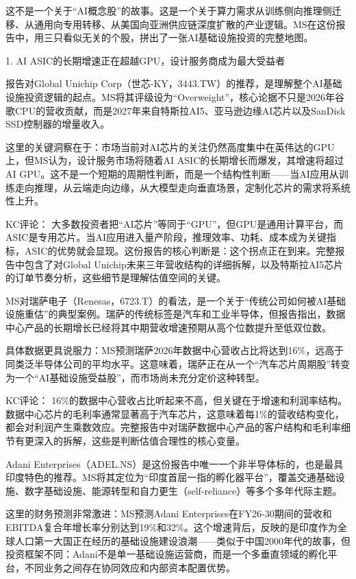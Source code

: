 \documentclass[11pt]{ctexart}
\begin{document}
这不是一个关于“AI概念股”的故事。这是一个关于算力需求从训练侧向推理侧迁移、从通用向专用转移、从美国向亚洲供应链深度扩散的产业逻辑。MS在这份报告中，用三只看似无关的个股，拼出了一张AI基础设施投资的完整地图。

1. AI ASIC的长期增速正在超越GPU，设计服务商成为最大受益者

报告对Global Unichip Corp（世芯-KY，3443.TW）的推荐，是理解整个AI基础设施投资逻辑的起点。MS将其评级设为“Overweight”，核心论据不只是2026年谷歌CPU的营收贡献，而是2027年来自特斯拉AI5、亚马逊边缘AI芯片以及SanDisk SSD控制器的增量收入。

这里的关键洞察在于：市场当前对AI芯片的关注仍然高度集中在英伟达的GPU上，但MS认为，设计服务市场将随着AI ASIC的长期增长而爆发，其增速将超过AI GPU。这不是一个短期的周期性判断，而是一个结构性判断——当AI应用从训练走向推理，从云端走向边缘，从大模型走向垂直场景，定制化芯片的需求将系统性上升。

KC评论： 大多数投资者把“AI芯片”等同于“GPU”，但GPU是通用计算平台，而ASIC是专用芯片。当AI应用进入量产阶段，推理效率、功耗、成本成为关键指标，ASIC的优势就会显现。这份报告的核心判断是：这个拐点正在到来。完整报告中包含了对Global Unichip未来三年营收结构的详细拆解，以及特斯拉AI5芯片的订单节奏分析，这些细节是理解估值空间的关键。

MS对瑞萨电子（Renesas，6723.T）的看法，是一个关于“传统公司如何被AI基础设施重估”的典型案例。瑞萨的传统标签是汽车和工业半导体，但报告指出，数据中心产品的长期增长已经将其中期营收增速预期从高个位数提升至低双位数。

具体数据更具说服力：MS预测瑞萨2026年数据中心营收占比将达到16\%，远高于同类泛半导体公司的平均水平。这意味着，瑞萨正在从一个“汽车芯片周期股”转变为一个“AI基础设施受益股”，而市场尚未充分定价这种转型。

KC评论： 16\%的数据中心营收占比听起来不高，但关键在于增速和利润率结构。数据中心芯片的毛利率通常显著高于汽车芯片，这意味着每1\%的营收结构变化，都会对利润产生乘数效应。完整报告中对瑞萨数据中心产品的客户结构和毛利率细节有更深入的拆解，这些是判断估值合理性的核心变量。

Adani Enterprises（ADEL.NS）是这份报告中唯一一个非半导体标的，也是最具印度特色的推荐。MS将其定位为“印度首屈一指的孵化器平台”，覆盖交通基础设施、数字基础设施、能源转型和自力更生（self-reliance）等多个多年代际主题。

这里的财务预测非常激进：MS预测Adani Enterprises在FY26-30期间的营收和EBITDA复合年增长率分别达到19\%和32\%。这个增速背后，反映的是印度作为全球人口第一大国正在经历的基础设施建设浪潮——类似于中国2000年代的故事，但投资框架不同：Adani不是单一基础设施运营商，而是一个多垂直领域的孵化平台，不同业务之间存在协同效应和内部资本配置优势。
\end{document}
